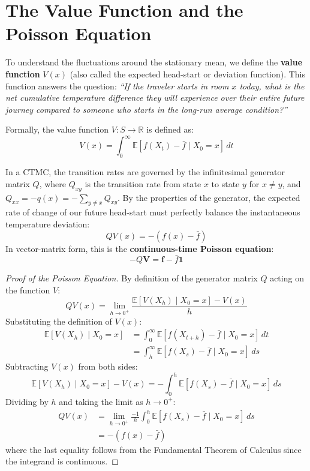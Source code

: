 \documentclass[11pt]{article}
\begin{document}
\section{The Value Function and the Poisson Equation}

To understand the fluctuations around the stationary mean, we define the \textbf{value function} $V(x)$ (also called the expected head-start or deviation function). This function answers the question: \textit{``If the traveler starts in room $x$ today, what is the net cumulative temperature difference they will experience over their entire future journey compared to someone who starts in the long-run average condition?''}

Formally, the value function $V: S \to \mathbb{R}$ is defined as:
\begin{equation}
    V(x) = \int_0^\infty \mathbb{E}[ f(X_t) - \bar{f} \mid X_0 = x ] \, dt
\end{equation}

In a CTMC, the transition rates are governed by the infinitesimal generator matrix $Q$, where $Q_{xy}$ is the transition rate from state $x$ to state $y$ for $x \neq y$, and $Q_{xx} = -q(x) = -\sum_{y \neq x} Q_{xy}$. By the properties of the generator, the expected rate of change of our future head-start must perfectly balance the instantaneous temperature deviation:
\begin{equation}
    Q V(x) = -(f(x) - \bar{f})
\end{equation}
In vector-matrix form, this is the \textbf{continuous-time Poisson equation}:
\begin{equation}
    -Q \mathbf{V} = \mathbf{f} - \bar{f}\mathbf{1}
\end{equation}

\begin{proof}[Proof of the Poisson Equation]
By definition of the generator matrix $Q$ acting on the function $V$:
\begin{equation}
    Q V(x) = \lim_{h \to 0^+} \frac{\mathbb{E}[V(X_h) \mid X_0 = x] - V(x)}{h}
\end{equation}
Substituting the definition of $V(x)$:
\begin{align}
    \mathbb{E}[V(X_h) \mid X_0 = x] &= \int_0^\infty \mathbb{E}[ f(X_{t+h}) - \bar{f} \mid X_0 = x ] \, dt \nonumber \\
    &= \int_h^\infty \mathbb{E}[ f(X_s) - \bar{f} \mid X_0 = x ] \, ds
\end{align}
Subtracting $V(x)$ from both sides:
\begin{equation}
    \mathbb{E}[V(X_h) \mid X_0 = x] - V(x) = -\int_0^h \mathbb{E}[ f(X_s) - \bar{f} \mid X_0 = x ] \, ds
\end{equation}
Dividing by $h$ and taking the limit as $h \to 0^+$:
\begin{align}
    Q V(x) &= \lim_{h \to 0^+} \frac{-1}{h} \int_0^h \mathbb{E}[ f(X_s) - \bar{f} \mid X_0 = x ] \, ds \nonumber \\
    &= -(f(x) - \bar{f})
\end{align}
where the last equality follows from the Fundamental Theorem of Calculus since the integrand is continuous.
\end{proof}
\end{document}
